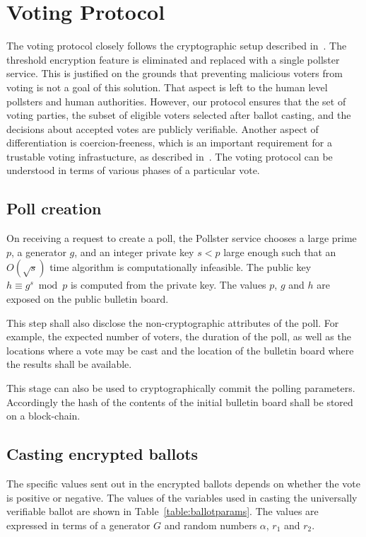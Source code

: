 
\section{Voting Protocol}

The voting protocol closely follows the cryptographic
setup described in~\cite{Cramer:1997:SOE:1754542.1754554}.  The
threshold encryption feature is eliminated and replaced with a single
pollster service.
This is justified on the grounds that preventing malicious voters from voting is not a
goal of this solution.  That aspect is left to the human level pollsters and human authorities.
However, our protocol ensures that the set of voting parties, the subset of eligible
voters selected after ballot casting, and the decisions about
accepted votes are publicly verifiable.
Another aspect of differentiation is coercion-freeness, which
is an important requirement for a trustable voting infrastucture,
as described in~\cite{Karlof:2005:CVP:1251398.1251401}.
The voting protocol can be understood in terms of various phases of a
particular vote.

\subsection{Poll creation}
On receiving a request to create a poll, the Pollster service
chooses a large prime $p$, a generator $g$, and an integer private key $s < p$
large enough such that an $O(\sqrt s)$ time algorithm is computationally
infeasible.
The public key $h \equiv g^s\bmod p$ is computed from the private key.
The values $p$, $g$ and $h$
are exposed on the public bulletin board.

This step shall also disclose the non-cryptographic
attributes of the poll. For example, the expected number of voters,
the duration of the poll, as well as the
locations where a vote may be cast and the location of the
bulletin board where the results shall be available.

This stage can also be used to cryptographically commit the
polling parameters.  Accordingly the hash of the contents of the
initial bulletin board shall be stored on a block-chain.


\subsection{Casting encrypted ballots}

The specific values sent out in the encrypted ballots depends on
whether the vote is positive or negative.  The values of the variables
used in casting the universally verifiable ballot are shown in
Table~\ref{table:ballotparams}.  The values are expressed in terms of
a generator $G$ and random numbers $\alpha$, $r_1$ and $r_2$.



